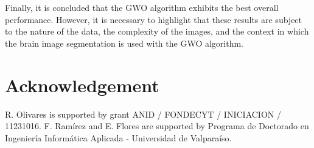 \documentclass{elsarticle}
\begin{document}
Finally, it is concluded that the GWO algorithm exhibits the best overall performance. However, it is necessary to highlight that these results are subject to the nature of the data, the complexity of the images, and the context in which the brain image segmentation is used with the GWO algorithm.

\section*{Acknowledgement}
R. Olivares is supported by grant ANID / FONDECYT / INICIACION / 11231016. F. Ram\'irez and E. Flores are supported by Programa de Doctorado en Ingenier\'ia Informática Aplicada - Universidad de Valpara\'iso.



\end{document}
